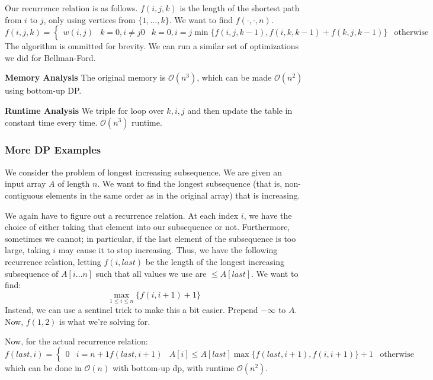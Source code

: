 \begin{algothm}
    Our recurrence relation is as follows. $f(i, j, k)$ is the length of the shortest path from $i$ to $j$, only using vertices from $\{1, \dots, k\}$. We want to find $f(\cdot, \cdot, n)$.
    \[ f(i, j, k) = \begin{cases}
        w(i, j) & k = 0, i \neq j
        0 & k = 0, i = j
        \min\{f(i, j, k - 1), f(i, k, k - 1) + f(k, j, k - 1)\} & \text{otherwise}
    \end{cases} \]
    The algorithm is ommitted for brevity. We can run a similar set of optimizations we did for Bellman-Ford.

    \textbf{Memory Analysis}
    The original memory is $\mathcal{O}(n^3)$, which can be made $\mathcal{O}(n^2)$ using bottom-up DP.

    \textbf{Runtime Analysis} We triple for loop over $k, i, j$ and then update the table in constant time every time. $\mathcal{O}(n^3)$ runtime.
\end{algothm}

\subsubsection{More DP Examples}
We consider the problem of longest increasing subsequence. We are given an input array $A$ of length $n$. We want to find the longest
subsequence (that is, non-contiguous elements in the same order as in the original array) that is increasing.

We again have to figure out a recurrence relation. At each index $i$, we have the choice of either taking that element into our
subsequence or not. Furthermore, sometimes we cannot; in particular, if the last element of the subsequence is too large, taking $i$
may cause it to stop increasing. Thus, we have the following recurrence relation, letting $f(i, last)$ be the length of the longest increasing
subsequence of $A[i \dots n]$ such that all values we use are $\leq A[last]$. We want to find:
\[ \max_{1 \leq i \leq n} \{ f(i, i + 1) + 1 \} \]
Instead, we can use a sentinel trick to make this a bit easier. Prepend $- \infty$ to $A$. Now,
$f(1, 2)$ is what we're solving for.

Now, for the actual recurrence relation:
\[ f(last, i) = \begin{cases}
    0 & i = n + 1
    f(last, i + 1) & A[i] \leq A[last]
    \max\{f(last, i + 1), f(i, i + 1) \} + 1 & \text{otherwise}
\end{cases} \]
which can be done in $\mathcal{O}(n)$ with bottom-up dp, with runtime $\mathcal{O}(n^2)$.